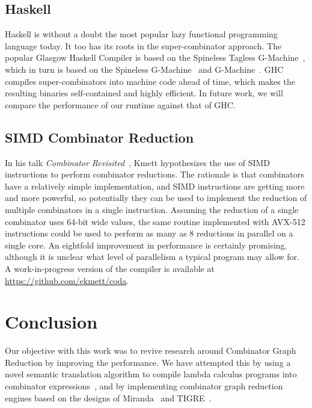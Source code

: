 \documentclass[conference]{IEEEtran}
\begin{document}
\subsection{Haskell}
Haskell is without a doubt the most popular lazy functional programming language today.
It too has its roots in the super-combinator approach.
The popular Glasgow Haskell Compiler is based on the Spineless Tagless G-Machine~\cite{jones_implementing_nodate}, which in turn is based on the Spineless G-Machine~\cite{burn_spineless_1988} and G-Machine~\cite{kieburtz_g-machine_1985}.
GHC compiles super-combinators into machine code ahead of time, which makes the resulting binaries self-contained and highly efficient.
In future work, we will compare the performance of our runtime against that of GHC.

\subsection{SIMD Combinator Reduction}
In his talk \emph{Combinator Revisited}~\cite{kmett_combinators_2018}, Kmett hypothesizes the use of SIMD instructions to perform combinator reductions.
The rationale is that combinators have a relatively simple implementation, and SIMD instructions are getting more and more powerful, so potentially they can be used to implement the reduction of multiple combinators in a single instruction.
Assuming the reduction of a single combinator uses 64-bit wide values, the same routine implemented with AVX-512 instructions could be used to perform as many as 8 reductions in parallel on a single core.
An eightfold improvement in performance is certainly promising, although it is unclear what level of parallelism a typical program may allow for.
A work-in-progress version of the compiler is available at \url{https://github.com/ekmett/coda}.

\section{Conclusion}
Our objective with this work was to revive research around Combinator Graph Reduction by improving the performance.
We have attempted this by using a novel semantic translation algorithm to compile lambda calculus programs into combinator expressions~\cite{kiselyov_lambda_2018}, and by implementing combinator graph reduction engines based on the designs of Miranda~\cite{turner_new_1979} and TIGRE~\cite{koopman_fresh_1989}.
\end{document}
